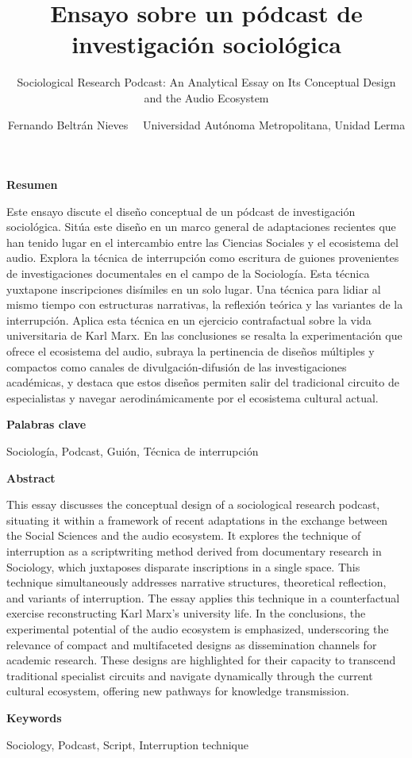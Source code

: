 \documentclass[
]{interact}
\title{Ensayo sobre un pódcast de investigación sociológica}
\subtitle{Sociological Research Podcast: An Analytical Essay on Its
Conceptual Design and the Audio Ecosystem}
\author{Fernando Beltrán Nieves \textbar\ \textbar\ 
Universidad Autónoma Metropolitana, Unidad Lerma}
\begin{document}
\captionsetup{labelsep=space}
\maketitle


\newcommand{\articuloTitulo}{Podcast de investigación sociológica}

\begin{footnotesize}
\textbf{Resumen}

Este ensayo discute el diseño conceptual de un pódcast de investigación sociológica. Sitúa este diseño en un marco general de adaptaciones recientes que han tenido lugar en el intercambio entre las Ciencias Sociales y el ecosistema del audio. Explora la técnica de interrupción como escritura de guiones provenientes de investigaciones documentales en el campo de la Sociología. Esta técnica yuxtapone inscripciones disímiles en un solo lugar. Una técnica para lidiar al mismo tiempo con estructuras narrativas, la reflexión teórica y las variantes de la interrupción. Aplica esta técnica en un ejercicio contrafactual sobre la vida universitaria de Karl Marx. En las conclusiones se resalta la experimentación que ofrece el ecosistema del audio, subraya la pertinencia de diseños múltiples y compactos como canales de divulgación-difusión de las investigaciones académicas, y destaca que estos diseños permiten salir del tradicional circuito de especialistas y navegar aerodinámicamente por el ecosistema cultural actual.

\textbf{Palabras clave}

Sociología, Podcast, Guión, Técnica de interrupción
\end{footnotesize}

\newpage

\begin{footnotesize}
\textbf{Abstract}

This essay discusses the conceptual design of a sociological research podcast, situating it within a framework of recent adaptations in the exchange between the Social Sciences and the audio ecosystem. It explores the technique of interruption as a scriptwriting method derived from documentary research in Sociology, which juxtaposes disparate inscriptions in a single space. This technique simultaneously addresses narrative structures, theoretical reflection, and variants of interruption. The essay applies this technique in a counterfactual exercise reconstructing Karl Marx’s university life. In the conclusions, the experimental potential of the audio ecosystem is emphasized, underscoring the relevance of compact and multifaceted designs as dissemination channels for academic research. These designs are highlighted for their capacity to transcend traditional specialist circuits and navigate dynamically through the current cultural ecosystem, offering new pathways for knowledge transmission.

\textbf{Keywords}

Sociology, Podcast, Script, Interruption technique
\end{footnotesize}
\end{document}
